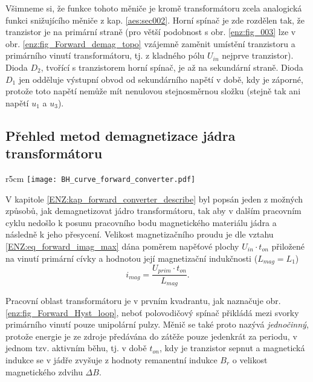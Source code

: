    \begin{note}
      Všimneme si, že funkce tohoto měniče je kromě transformátoru zcela analogická funkci
      snižujícího měniče z kap. \ref{aes:sec002}. Horní spínač je zde rozdělen tak, že
      tranzistor je na primární straně (pro větší podobnost s obr. \ref{enz:fig_003}
      lze v obr. \ref{enz:fig_Forward_demag_topo} vzájemně zaměnit umístění tranzistoru a        
      primárního vinutí transformátoru, tj. z kladného pólu $U_{in}$ nejprve tranzistor). Dioda
      $D_2$, tvořící s tranzistorem horní spínač, je až na sekundární straně. Dioda $D_1$ jen
      odděluje výstupní obvod od sekundárního napětí v době, kdy je záporné, protože  toto napětí
      nemůže mít nenulovou stejnosměrnou složku (stejně tak ani napětí $u_1$ a $u_3$).
    \end{note}

  \subsection{Přehled metod demagnetizace jádra transformátoru}
    \begin{wrapfigure}[14]{r}{5cm}  %
      \centering
      \texttt{[image: BH\_curve\_forward\_converter.pdf]}
      \caption[Hysterezní smyčka]{Transformátor jednočinného propustného měniče pracuje v prvním
        kvadrantu hysterezní smyčky}
      \label{enz:fig_Forward_Hyst_loop}
    \end{wrapfigure} 
    V kapitole \ref{ENZ:kap_forward_converter_describe} byl popsán jeden z možných způsobů, jak
    demagnetizovat jádro transformátoru, tak aby v dalším pracovním cyklu nedošlo k posunu
    pracovního bodu magnetického materiálu jádra a následně k jeho přesycení. Velikost
    magnetizačního proudu je dle vztahu \ref{ENZ:eq_forward_imag_max} dána poměrem napěťové plochy
    $U_{in}\cdot t_{on}$ přiložené na vinutí primární cívky a hodnotou její magnetizační
    indukčnosti ($L_{mag} = L_{1}$) 
    \begin{equation}
       i_{mag} = \frac{U_{prim}\cdot{t_{on}}}{L_{mag}}.
    \end{equation}
    
    Pracovní oblast transformátoru je v prvním kvadrantu, jak naznačuje obr.
    \ref{enz:fig_Forward_Hyst_loop}, neboť polovodičový spínač přikládá mezi svorky primárního
    vinutí pouze unipolární pulzy. Měnič se také proto nazývá \emph{jednočinný}, protože energie 
    je ze zdroje předávána do zátěže pouze jedenkrát za periodu, v jednom tzv. aktivním běhu, tj. 
    v době $t_{on}$, kdy je tranzistor sepnut a magnetická indukce se v jádře zvyšuje z hodnoty
    remanentní indukce $B_r$ o velikost magnetického zdvihu $\Delta B$.
    
